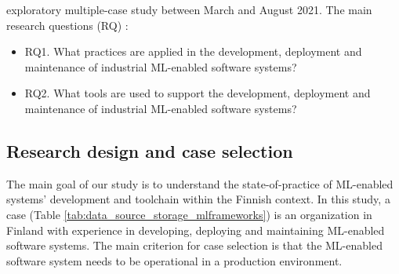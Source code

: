 %

\DIFdelbegin {}\DIFdelend \DIFaddbegin {}\DIFaddend exploratory multiple-case study \cite{Runeson2008} \DIFaddbegin {}\DIFaddend between March and August 2021. \DIFaddbegin {}\DIFaddend %
The main research questions (RQ) \DIFdelbegin {}\DIFdelend \DIFaddbegin {}\DIFaddend :
\begin{itemize}
    \item RQ1. What practices are applied in the development, deployment and maintenance of industrial ML-enabled software systems?
    \item RQ2. What tools are used to support the development, deployment and maintenance of industrial ML-enabled software systems?
\end{itemize}

\subsection{Research design and case selection}
The main goal of our study is to understand the state-of-practice of ML-enabled systems' development and toolchain within the Finnish context. In this study, a case (Table \ref{tab:data_source_storage_mlframeworks}) is an organization in Finland with experience in developing, deploying and maintaining ML-enabled software systems. The main criterion for case selection is that the ML-enabled software system needs to be operational in a production environment. %


